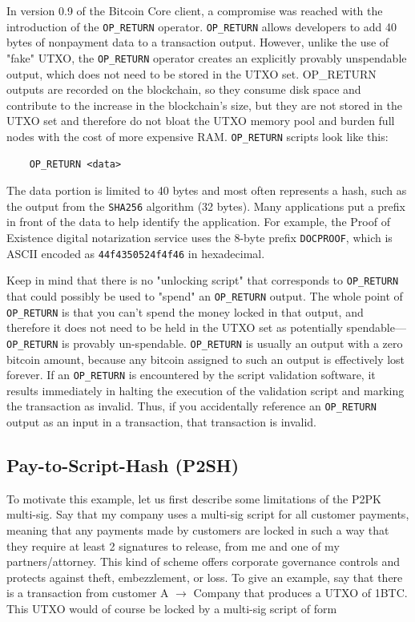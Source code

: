 \documentclass{article}
\begin{document}
    In version 0.9 of the Bitcoin Core client, a compromise was reached with the introduction of the \texttt{OP\_RETURN} operator. \texttt{OP\_RETURN} allows developers to add 40 bytes of nonpayment data to a transaction output. However, unlike the use of "fake" UTXO, the \texttt{OP\_RETURN} operator creates an explicitly provably unspendable output, which does not need to be stored in the UTXO set. OP\_RETURN outputs are recorded on the blockchain, so they consume disk space and contribute to the increase in the blockchain's size, but they are not stored in the UTXO set and therefore do not bloat the UTXO memory pool and burden full nodes with the cost of more expensive RAM. \texttt{OP\_RETURN} scripts look like this:

    \begin{lstlisting}
    OP_RETURN <data>
    \end{lstlisting}

    The data portion is limited to 40 bytes and most often represents a hash, such as the output from the \texttt{SHA256} algorithm (32 bytes). Many applications put a prefix in front of the data to help identify the application. For example, the Proof of Existence digital notarization service uses the 8-byte prefix \texttt{DOCPROOF}, which is ASCII encoded as \texttt{44f4350524f4f46} in hexadecimal.

    Keep in mind that there is no "unlocking script" that corresponds to \texttt{OP\_RETURN} that could possibly be used to "spend" an \texttt{OP\_RETURN} output. The whole point of \texttt{OP\_RETURN} is that you can't spend the money locked in that output, and therefore it does not need to be held in the UTXO set as potentially spendable—\texttt{OP\_RETURN} is provably un-spendable. \texttt{OP\_RETURN} is usually an output with a zero bitcoin amount, because any bitcoin assigned to such an output is effectively lost forever. If an \texttt{OP\_RETURN} is encountered by the script validation software, it results immediately in halting the execution of the validation script and marking the transaction as invalid. Thus, if you accidentally reference an \texttt{OP\_RETURN} output as an input in a transaction, that transaction is invalid.

  \subsection{Pay-to-Script-Hash (P2SH)}

    To motivate this example, let us first describe some limitations of the P2PK multi-sig. Say that my company uses a multi-sig script for all customer payments, meaning that any payments made by customers are locked in such a way that they require at least 2 signatures to release, from me and one of my partners/attorney. This kind of scheme offers corporate governance controls and protects against theft, embezzlement, or loss. To give an example, say that there is a transaction from customer A $\rightarrow$ Company that produces a UTXO of 1BTC. This UTXO would of course be locked by a multi-sig script of form
\end{document}
